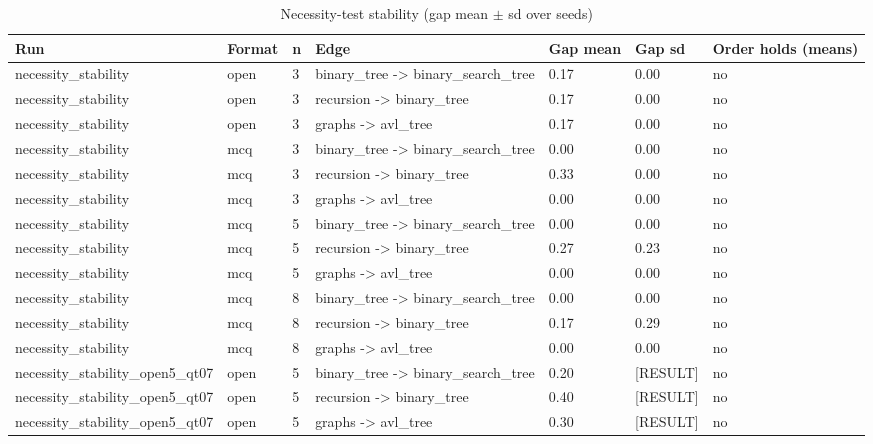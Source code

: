 \begin{table}[t]
\centering
\caption{Necessity-test stability (gap mean $\pm$ sd over seeds)}
\label{tab:necessity}
\small
\begin{tabular}{lllllll}
\toprule
Run & Format & n & Edge & Gap mean & Gap sd & Order holds (means) \\
\midrule
necessity\_stability & open & 3 & binary\_tree -> binary\_search\_tree & 0.17 & 0.00 & no \\
necessity\_stability & open & 3 & recursion -> binary\_tree & 0.17 & 0.00 & no \\
necessity\_stability & open & 3 & graphs -> avl\_tree & 0.17 & 0.00 & no \\
necessity\_stability & mcq & 3 & binary\_tree -> binary\_search\_tree & 0.00 & 0.00 & no \\
necessity\_stability & mcq & 3 & recursion -> binary\_tree & 0.33 & 0.00 & no \\
necessity\_stability & mcq & 3 & graphs -> avl\_tree & 0.00 & 0.00 & no \\
necessity\_stability & mcq & 5 & binary\_tree -> binary\_search\_tree & 0.00 & 0.00 & no \\
necessity\_stability & mcq & 5 & recursion -> binary\_tree & 0.27 & 0.23 & no \\
necessity\_stability & mcq & 5 & graphs -> avl\_tree & 0.00 & 0.00 & no \\
necessity\_stability & mcq & 8 & binary\_tree -> binary\_search\_tree & 0.00 & 0.00 & no \\
necessity\_stability & mcq & 8 & recursion -> binary\_tree & 0.17 & 0.29 & no \\
necessity\_stability & mcq & 8 & graphs -> avl\_tree & 0.00 & 0.00 & no \\
necessity\_stability\_open5\_qt07 & open & 5 & binary\_tree -> binary\_search\_tree & 0.20 & [RESULT] & no \\
necessity\_stability\_open5\_qt07 & open & 5 & recursion -> binary\_tree & 0.40 & [RESULT] & no \\
necessity\_stability\_open5\_qt07 & open & 5 & graphs -> avl\_tree & 0.30 & [RESULT] & no \\
\bottomrule
\end{tabular}
\end{table}
